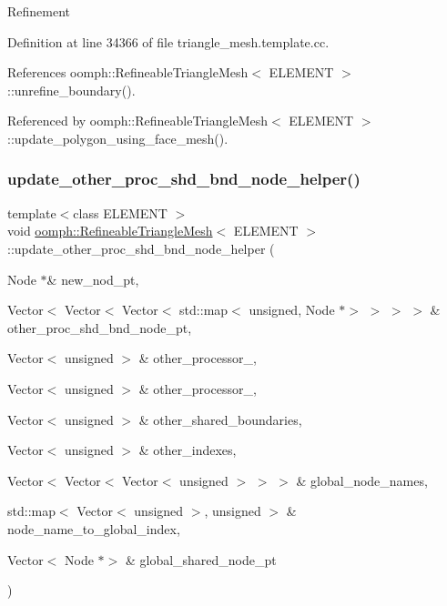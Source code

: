 Refinement 

Definition at line 34366 of file triangle\+\_\+mesh.\+template.\+cc.



References oomph\+::\+Refineable\+Triangle\+Mesh$<$ E\+L\+E\+M\+E\+N\+T $>$\+::unrefine\+\_\+boundary().



Referenced by oomph\+::\+Refineable\+Triangle\+Mesh$<$ E\+L\+E\+M\+E\+N\+T $>$\+::update\+\_\+polygon\+\_\+using\+\_\+face\+\_\+mesh().

\mbox{\label{classoomph_1_1RefineableTriangleMesh_aca337c6faea5466e63fa109b4404aaad}} 
\subsubsection{\texorpdfstring{update\+\_\+other\+\_\+proc\+\_\+shd\+\_\+bnd\+\_\+node\+\_\+helper()}{update\_other\_proc\_shd\_bnd\_node\_helper()}}
{\footnotesize\ttfamily template$<$class E\+L\+E\+M\+E\+NT $>$ \\
void \hyperlink{classoomph_1_1RefineableTriangleMesh}{oomph\+::\+Refineable\+Triangle\+Mesh}$<$ E\+L\+E\+M\+E\+NT $>$\+::update\+\_\+other\+\_\+proc\+\_\+shd\+\_\+bnd\+\_\+node\+\_\+helper (\begin{DoxyParamCaption}\item[{Node $\ast$\&}]{new\+\_\+nod\+\_\+pt,  }\item[{Vector$<$ Vector$<$ Vector$<$ std\+::map$<$ unsigned, Node $\ast$$>$ $>$ $>$ $>$ \&}]{other\+\_\+proc\+\_\+shd\+\_\+bnd\+\_\+node\+\_\+pt,  }\item[{Vector$<$ unsigned $>$ \&}]{other\+\_\+processor\+\_,  }\item[{Vector$<$ unsigned $>$ \&}]{other\+\_\+processor\+\_,  }\item[{Vector$<$ unsigned $>$ \&}]{other\+\_\+shared\+\_\+boundaries,  }\item[{Vector$<$ unsigned $>$ \&}]{other\+\_\+indexes,  }\item[{Vector$<$ Vector$<$ Vector$<$ unsigned $>$ $>$ $>$ \&}]{global\+\_\+node\+\_\+names,  }\item[{std\+::map$<$ Vector$<$ unsigned $>$, unsigned $>$ \&}]{node\+\_\+name\+\_\+to\+\_\+global\+\_\+index,  }\item[{Vector$<$ Node $\ast$$>$ \&}]{global\+\_\+shared\+\_\+node\+\_\+pt }\end{DoxyParamCaption})\hspace{0.3cm}{\ttfamily [protected]}}



